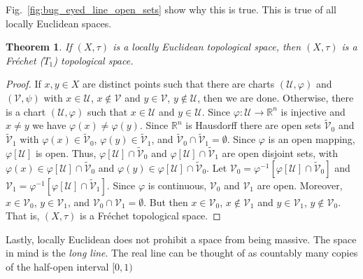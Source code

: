 \documentclass{article}
\theoremstyle{plain}
\newtheorem{theorem}{Theorem}[section]
\theoremstyle{normal}
\begin{document}
        Fig.~\ref{fig:bug_eyed_line_open_sets} show why this is true. This is
        true of all locally Euclidean spaces.
        \begin{theorem}
            If $(X,\tau)$ is a locally Euclidean topological space, then
            $(X,\tau)$ is a Fr\'{e}chet ($T_{1}$) topological space.
        \end{theorem}
        \begin{proof}
            If $x,y\in{X}$ are distinct points such that there are charts
            $(\mathcal{U},\varphi)$ and $(\mathcal{V},\psi)$ with
            $x\in\mathcal{U}$, $x\notin\mathcal{V}$ and
            $y\in\mathcal{V}$, $y\notin\mathcal{U}$, then we are done.
            Otherwise, there is a chart $(\mathcal{U},\varphi)$ such that
            $x\in\mathcal{U}$ and $y\in\mathcal{U}$. Since
            $\varphi:\mathcal{U}\rightarrow\mathbb{R}^{n}$ is injective and
            $x\ne{y}$ we have $\varphi(x)\ne\varphi(y)$. Since $\mathbb{R}^{n}$
            is Hausdorff there are open sets $\tilde{\mathcal{V}}_{0}$ and
            $\tilde{\mathcal{V}}_{1}$ with
            $\varphi(x)\in\tilde{\mathcal{V}}_{0}$,
            $\varphi(y)\in\tilde{\mathcal{V}}_{1}$, and
            $\tilde{\mathcal{V}}_{0}\cap\tilde{\mathcal{V}}_{1}=\emptyset$.
            Since $\varphi$ is an open mapping, $\varphi[\mathcal{U}]$ is open.
            Thus, $\varphi[\mathcal{U}]\cap\tilde{\mathcal{V}}_{0}$ and
            $\varphi[\mathcal{U}]\cap\tilde{\mathcal{V}}_{1}$ are open disjoint
            sets, with
            $\varphi(x)\in\varphi[\mathcal{U}]\cap\tilde{\mathcal{V}}_{0}$ and
            $\varphi(y)\in\varphi[\mathcal{U}]\cap\tilde{\mathcal{V}}_{0}$.
            Let $\mathcal{V}_{0}=\varphi^{-1}[\varphi[\mathcal{U}]\cap\tilde{\mathcal{V}}_{0}]$
            and $\mathcal{V}_{1}=\varphi^{-1}[\varphi[\mathcal{U}]\cap\tilde{\mathcal{V}}_{1}]$.
            Since $\varphi$ is continuous, $\mathcal{V}_{0}$ and
            $\mathcal{V}_{1}$ are open. Moreover,
            $x\in\mathcal{V}_{0}$, $y\in\mathcal{V}_{1}$, and
            $\mathcal{V}_{0}\cap\mathcal{V}_{1}=\emptyset$. But then
            $x\in\mathcal{V}_{0}$, $x\notin\mathcal{V}_{1}$ and
            $y\in\mathcal{V}_{1}$, $y\notin\mathcal{V}_{0}$. That is,
            $(X,\tau)$ is a Fr\'{e}chet topological space.
        \end{proof}
        Lastly, locally Euclidean does not prohibit a space from being massive.
        The space in mind is the \textit{long line}. The real line can be
        thought of as countably many copies of the half-open interval $[0,1)$
\end{document}
